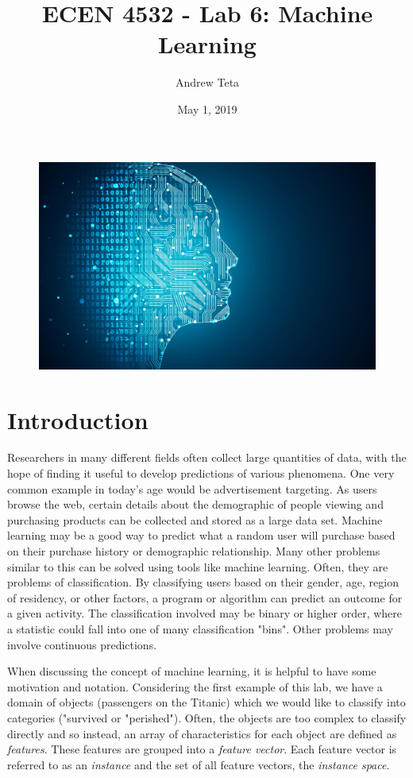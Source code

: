 \documentclass[11pt,a4paper]{article}
\author{Andrew Teta}
\title{ECEN 4532 - Lab 6: Machine Learning}
\date{May 1, 2019}
\begin{document}
\maketitle

\begin{figure}[ht]
	\centering
	\includegraphics[width=\textwidth]{ml}
\end{figure}

\pagebreak

\tableofcontents

\pagebreak

\section{Introduction}
Researchers in many different fields often collect large quantities of data, with the hope of finding it useful to develop predictions of various phenomena. One very common example in today's age would be advertisement targeting. As users browse the web, certain details about the demographic of people viewing and purchasing products can be collected and stored as a large data set. Machine learning may be a good way to predict what a random user will purchase based on their purchase history or demographic relationship. Many other problems similar to this can be solved using tools like machine learning. Often, they are problems of classification. By classifying users based on their gender, age, region of residency, or other factors, a program or algorithm can predict an outcome for a given activity. The classification involved may be binary or higher order, where a statistic could fall into one of many classification "bins". Other problems may involve continuous predictions. 

When discussing the concept of machine learning, it is helpful to have some motivation and notation. Considering the first example of this lab, we have a domain of objects (passengers on the Titanic) which we would like to classify into categories ("survived or "perished"). Often, the objects are too complex to classify directly and so instead, an array of characteristics for each object are defined as \textit{features}. These features are grouped into a \textit{feature vector}. Each feature vector is referred to as an \textit{instance} and the set of all feature vectors, the \textit{instance space}. 
\end{document}
